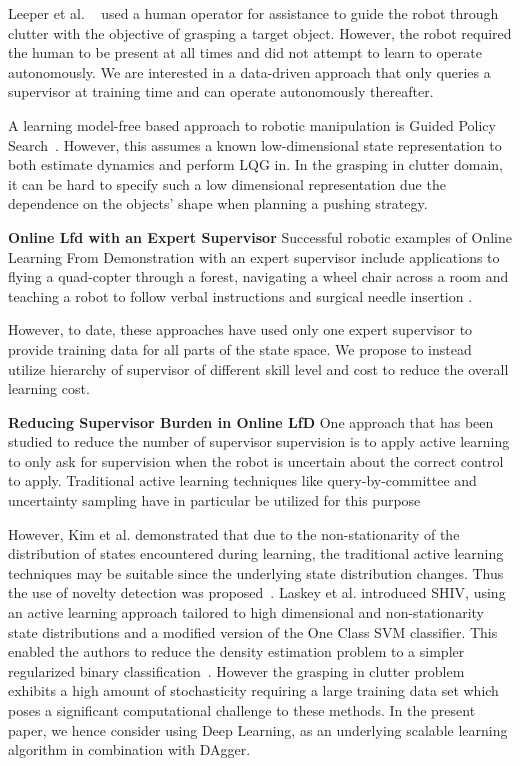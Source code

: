 \documentclass[10pt, conference]{ieeeconf}      %
\begin{document}
Leeper et al. ~\cite{leeper2012strategies} used a human operator for assistance
to guide the robot through clutter with the objective of grasping a target object. However, the robot required the human
to be present at all times and did not attempt to learn to operate autonomously. We are interested in a data-driven
approach that only queries a supervisor at training time and  can operate autonomously thereafter.


A learning model-free based approach to robotic manipulation is Guided Policy Search~\cite{levine2015end}. However, this assumes a known low-dimensional state representation to both estimate dynamics and perform LQG in. In the grasping in clutter domain, it can be hard to specify such a low dimensional representation due the dependence on the objects' shape when planning a pushing strategy. 



\noindent \textbf{Online Lfd with an Expert Supervisor}
Successful robotic examples of Online Learning From Demonstration with an expert supervisor include applications to flying a quad-copter through a forest, navigating a wheel chair across a room and teaching a robot to follow verbal instructions and surgical needle insertion \cite{ross2013learning, kim2013maximum, duvallet2013imitation, laskeyshiv}. 

However, to date, these approaches have used only one expert supervisor to provide training data for all parts of the
state space. We propose to instead utilize hierarchy of supervisor of different skill level and cost to reduce the
overall learning cost. 

\noindent\textbf{Reducing Supervisor Burden in Online LfD} One approach that has been studied to reduce the number of
supervisor supervision is to apply active learning to only ask for supervision when the robot is uncertain about the
correct control to apply. Traditional active learning techniques like query-by-committee and uncertainty sampling have
in particular be utilized for this purpose \cite{chernova2009interactive,judah2011active,grollman2007dogged}

However, Kim et al. demonstrated that due to the non-stationarity of the distribution of states encountered during
learning, the traditional active learning techniques may be suitable since the underlying state distribution changes.
Thus the use of novelty detection was proposed~\cite{kim2013maximum}. Laskey et al. introduced SHIV, using an active
learning approach tailored to high dimensional and non-stationarity state distributions and a modified version of the
One Class SVM classifier. This enabled the authors to reduce the density estimation problem to a 
simpler regularized binary classification~\cite{laskeyshiv}. However the grasping in clutter problem exhibits a high amount
of stochasticity requiring a large training data set which poses a significant computational challenge to these methods.
In the present paper, we hence consider using Deep Learning, as an underlying scalable learning algorithm in combination
with DAgger.
\end{document}
